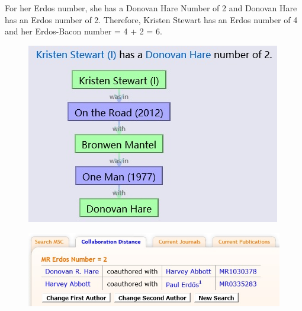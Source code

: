 \documentclass{article}
\begin{document}
		For her Erdos number, she has a Donovan Hare Number of 2 and Donovan Hare has an Erdos number of 2. Therefore,  Kristen Stewart has an Erdos number of 4 and her Erdos-Bacon number = 4 + 2 = 6.
		\begin{figure}[h]
			\centering
			\begin{minipage}{.4\textwidth}
				\centering
				\includegraphics[width=1\linewidth]{DonovanHareNumber.png}
				\label{fig:Donovan Hare Number}
			\end{minipage}%
			\begin{minipage}{.6\textwidth}
				\centering 
				\includegraphics[width=1\linewidth]{ErdosNumber.png}
				\label{fig:Erdos Number}
			\end{minipage}
		\end{figure}
\end{document}
